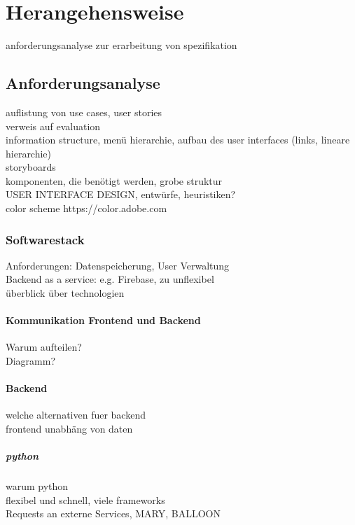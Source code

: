 
\chapter{Herangehensweise}

anforderungsanalyse zur erarbeitung von spezifikation

\section{Anforderungsanalyse}

auflistung von use cases, user stories\\
verweis auf evaluation\\
information structure, menü hierarchie, aufbau des user interfaces (links, lineare hierarchie)\\
storyboards\\

komponenten, die benötigt werden, grobe struktur\\

USER INTERFACE DESIGN, entwürfe, heuristiken?\\
color scheme https://color.adobe.com \\

\subsection{Softwarestack}

Anforderungen: Datenspeicherung, User Verwaltung\\
Backend as a service: e.g. Firebase, zu unflexibel\\

überblick über technologien

\subsubsection{Kommunikation Frontend und Backend}

Warum aufteilen?\\
Diagramm?

\subsubsection{Backend}
welche alternativen fuer backend\\
frontend unabhäng von daten

\paragraph{python}
warum python\\
flexibel und schnell, viele frameworks\\
Requests an externe Services, MARY, BALLOON

